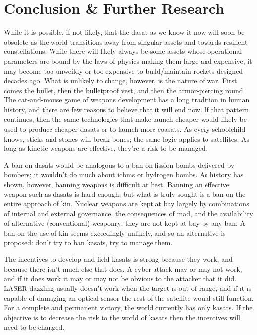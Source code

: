 \section{Conclusion \& Further Research}

While it is possible, if not likely, that the \ac{dasat} as we know it
now will soon be obsolete as the world transitions away from singular
assets and towards resilient constellations.  While there will likely
always be some assets whose operational parameters are bound by the
laws of physics making them large and expensive, it may become too
unweildy or too expensive to build/maintain rockets designed decades
ago.  What is unlikely to change, however, is the nature of war.
First comes the bullet, then the bulletproof vest, and then the
armor-piercing round.  The cat-and-mouse game of weapons development
has a long tradition in human history, and there are few reasons to
believe that it will end now.  If that pattern continues, then the
same technologies that make launch cheaper would likely be used to
produce cheaper \acp{dasat} or to launch more \acp{coasat}.  As every
schoolchild knows, sticks and stones will break bones; the same logic
applies to satellites.  As long as kinetic weapons are effective,
they're a risk to be managed.

A ban on \aclp{dasat} would be analogous to a ban on fission bombs
delivered by bombers; it wouldn't do much about \acp{icbm} or hydrogen
bombs.  As history has shown, however, banning weapons is difficult at
best.  Banning an effective weapon such as \acp{dasat} is hard enough,
but what is truly sought is a ban on the entire approach of \ac{kin}.
Nuclear weapons are kept at bay largely by combinations of internal
and external governance, the consequences of \ac{mad}, and the
availability of alternative (conventional) weaponry; they are not kept
at bay by any ban.  A ban on the use of \ac{kin} seems exceedingly
unlikely, and so an alternative is proposed: don't try to ban
\acp{kasat}, try to manage them.

The incentives to develop and field \acp{kasat} is strong because they
work, and because there isn't much else that does.  A cyber attack may
or may not work, and if it does work it may or may not be obvious to
the attacker that it did.  LASER dazzling usually doesn't work when
the target is out of range, and if it is capable of damaging an
optical sensor the rest of the satellite would still function.  For a
complete and permanent victory, the world currently has only
\acp{kasat}.  If the objective is to decrease the risk to the world of
\acp{kasat} then the incentives will need to be changed.


